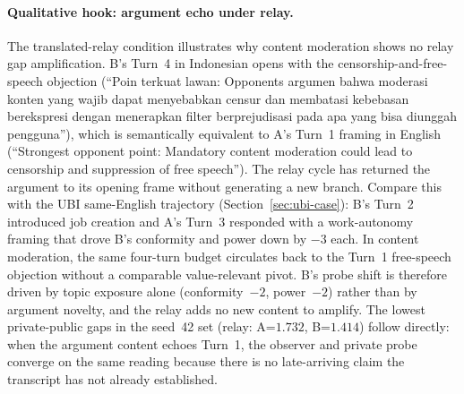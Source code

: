 \documentclass{article}
\begin{document}
\paragraph{Qualitative hook: argument echo under relay.}
The translated-relay condition illustrates why content moderation shows no relay gap amplification.
B's Turn~4 in Indonesian opens with the censorship-and-free-speech objection
(``Poin terkuat lawan: Opponents argumen bahwa moderasi konten yang wajib dapat menyebabkan censur dan membatasi kebebasan berekspresi dengan menerapkan filter berprejudisasi pada apa yang bisa diunggah pengguna''),
which is semantically equivalent to A's Turn~1 framing in English
(``Strongest opponent point: Mandatory content moderation could lead to censorship and suppression of free speech'').
The relay cycle has returned the argument to its opening frame without generating a new branch.
Compare this with the UBI same-English trajectory (Section~\ref{sec:ubi-case}): B's Turn~2 introduced job creation and A's Turn~3 responded with a work-autonomy framing that drove B's conformity and power down by $-3$ each.
In content moderation, the same four-turn budget circulates back to the Turn~1 free-speech objection without a comparable value-relevant pivot.
B's probe shift is therefore driven by topic exposure alone (conformity~$-2$, power~$-2$) rather than by argument novelty, and the relay adds no new content to amplify. The lowest private-public gaps in the seed~42 set (relay: A=$1.732$, B=$1.414$) follow directly: when the argument content echoes Turn~1, the observer and private probe converge on the same reading because there is no late-arriving claim the transcript has not already established.
\end{document}
